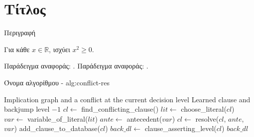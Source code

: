 \section{Τίτλος}


\begin{theorem}
Περιγραφή
\end{theorem}

\begin{lemma}
Για κάθε $x\in\mathbb{R}$, ισχύει $x^2\geq 0$.
\end{lemma}

Παράδειγμα αναφοράς: \cite{BALABANOVJIANG2012}.
Παράδειγμα αναφοράς: \cite{papadopoulos2020}.

\begin{myalgorithm}{Όνομα αλγορίθμου - }{alg:conflict-res}
\begin{algorithmic}[1]
    \Require Implication graph and a conflict at the current decision level
    \Ensure Learned clause and backjump level
            \State \Return $-1$
        \EndIf
        \State $cl \gets$ find\_conflicting\_clause()
            \State $lit \gets$ choose\_literal($cl$)
            \State $var \gets$ variable\_of\_literal($lit$)
            \State $ante \gets$ antecedent($var$)
            \State $cl \gets$ resolve($cl$, $ante$, $var$)
        \EndWhile
        \State add\_clause\_to\_database($cl$)
        \State $back\_dl \gets$ clause\_asserting\_level($cl$)
        \State \Return $back\_dl$
    \EndFunction
    \end{algorithmic}
\end{myalgorithm}